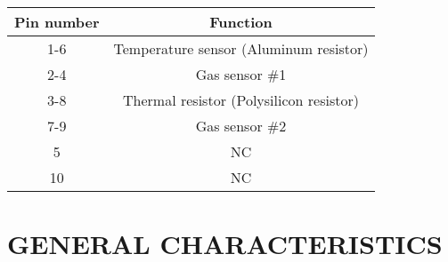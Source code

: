 \documentclass[10pt]{datasheet}
\begin{document}
\begin{table}[htbp]
    \centering
    \begin{tabular}{|c|c|}
        \hline
        Pin number & Function \\
        \hline
        1-6 & Temperature sensor (Aluminum resistor) \\
        \hline
        2-4 & Gas sensor \#1 \\
        \hline
        3-8 & Thermal resistor (Polysilicon resistor) \\
        \hline
        7-9 & Gas sensor \#2 \\
        \hline
        5 & NC \\
        \hline
        10 & NC \\
        \hline
    \end{tabular}
\end{table}


\section*{GENERAL CHARACTERISTICS}
\end{document}

